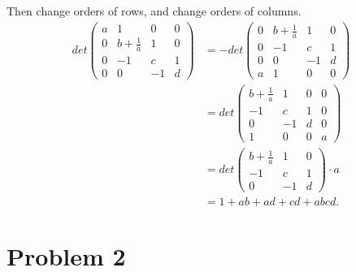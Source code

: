 \documentclass[12pt]{article}
\begin{document}
\begin{enumerate}
Then change orders of rows, and change orders of columns. 
\begin{equation*}
\begin{aligned}
det
\begin{pmatrix}
a & 1 & 0 & 0\\
0 & b + \frac{1}{a} & 1 & 0 \\
0 & -1 & c & 1 \\
0 & 0 & -1 & d
\end{pmatrix}
& = 
- det
\begin{pmatrix}
0 & b + \frac{1}{a} & 1 & 0 \\
0 & -1 & c & 1 \\
0 & 0 & -1 & d \\
a & 1 & 0 & 0
\end{pmatrix} \\
& = 
det
\begin{pmatrix}
b + \frac{1}{a} & 1 & 0 & 0 \\
-1 & c & 1 & 0 \\
0 & -1 & d & 0\\
1 & 0 & 0 & a
\end{pmatrix} \\
& = 
det 
\begin{pmatrix}
b + \frac{1}{a} & 1 & 0\\
-1 & c & 1 \\
0 & -1 & d
\end{pmatrix} 
\cdot a \\
& = 1 + ab + ad + cd + abcd.
\end{aligned}
\end{equation*}

\end{enumerate}


\section{Problem 2}
\end{document}
